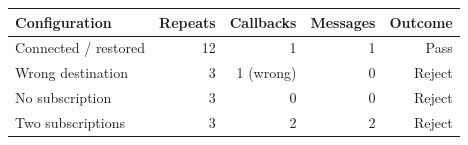 \begin{tabular}{lrrrr}\toprule
Configuration & Repeats & Callbacks & Messages & Outcome \\ \midrule
Connected / restored & 12 & 1 & 1 & Pass \\
Wrong destination & 3 & 1 (wrong) & 0 & Reject \\
No subscription & 3 & 0 & 0 & Reject \\
Two subscriptions & 3 & 2 & 2 & Reject \\
\bottomrule\end{tabular}
